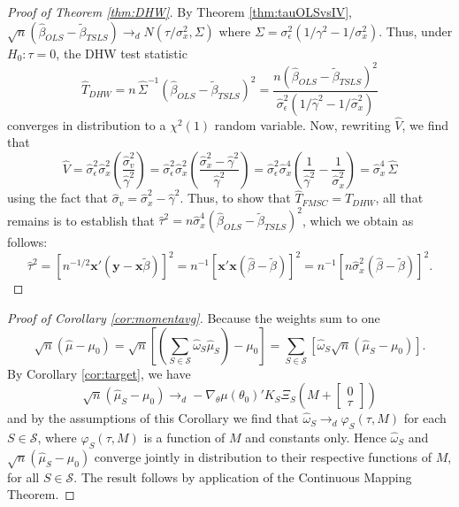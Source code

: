 \begin{proof}[Proof of Theorem \ref{thm:DHW}] 
By Theorem \ref{thm:tauOLSvsIV}, $\sqrt{n}(\widehat{\beta}_{OLS} - \widetilde{\beta}_{TSLS}) \rightarrow_d N\left(\tau/\sigma_x^2, \Sigma \right)$
where $\Sigma =  \sigma_\epsilon^2 \left(1/\gamma^2 - 1/\sigma_x^2 \right)$.
Thus, under $H_0 \colon \tau = 0$, the DHW test statistic 
$$\widehat{T}_{DHW} = n\, \widehat{\Sigma}^{-1}(\widehat{\beta}_{OLS} - \widetilde{\beta}_{TSLS})^2 = \frac{n(\widehat{\beta}_{OLS} - \widetilde{\beta}_{TSLS})^2}{ \widehat{\sigma}_\epsilon^2 \left(1/\widehat{\gamma}^2 - 1/\widehat{\sigma}_x^2 \right)}$$
converges in distribution to a $\chi^2(1)$ random variable. 
Now, rewriting $\widehat{V}$, we find that
$$\widehat{V} = \widehat{\sigma}_\epsilon^2 \widehat{\sigma}_x^2\left(\frac{\widehat{\sigma}_v^2 }{\widehat{\gamma}^2}\right) = \widehat{\sigma}_\epsilon^2 \widehat{\sigma}_x^2\left(\frac{\widehat{\sigma}_x^2 - \widehat{\gamma}^2 }{\widehat{\gamma}^2}\right) = \widehat{\sigma}_\epsilon^2 \widehat{\sigma}_x^4\left(\frac{1}{\widehat{\gamma}^2} - \frac{1}{\widehat{\sigma}_x^2}\right) = \widehat{\sigma}_x^4 \,\widehat{\Sigma}$$
using the fact that $\widehat{\sigma}_v = \widehat{\sigma}_x^2 - \widehat{\gamma}^2$. 
Thus, to show that $\widehat{T}_{FMSC} = \widehat{T}_{DHW}$, all that remains is to establish that $\widehat{\tau}^2 = n\widehat{\sigma}_x^4 (\widehat{\beta}_{OLS} - \widetilde{\beta}_{TSLS})^2$, which we obtain as follows:
    $$\widehat{\tau}^2  =  \left[n^{-1/2} \textbf{x}'(\mathbf{y} - \mathbf{x}\widetilde{\beta})\right]^2 = n^{-1}\left[\mathbf{x}'\mathbf{x} \left( \widehat{\beta} - \widetilde{\beta}\right) \right]^2 = n^{-1}\left[n \widehat{\sigma}_x^2 \left( \widehat{\beta} - \widetilde{\beta}\right) \right]^2.$$
\end{proof}

\begin{proof}[Proof of Corollary \ref{cor:momentavg}]
Because the weights sum to one
		$$\sqrt{n}\left(\widehat{\mu} - \mu_0\right) = \sqrt{n} \left[\left(\sum_{S \in \mathscr{S}} \widehat{\omega}_S \widehat{\mu}_S\right) - \mu_0\right]= \sum_{S \in \mathscr{S}}\left[ \widehat{\omega}_S \sqrt{n}\left(\widehat{\mu}_S - \mu_0\right)\right].$$
By Corollary \ref{cor:target}, we have
$$\sqrt{n}\left(\widehat{\mu}_S - \mu_0\right)\rightarrow_d-\nabla_\theta\mu(\theta_0)'K_S \Xi_S \left(M +  \left[\begin{array}
	{c} 0 \\ \tau
\end{array} \right]\right)$$
and by the assumptions of this Corollary we find that $\widehat{\omega}_S \rightarrow_d\varphi_S(\tau,M)$ for each $S\in \mathscr{S}$, where $\varphi_S(\tau,M)$ is a function of $M$ and constants only. 
Hence $\widehat{\omega}_S$ and $\sqrt{n}\left(\widehat{\mu}_S - \mu_0\right)$ converge jointly in distribution to their respective functions of $M$, for all $S \in \mathscr{S}$. 
The result follows by application of the Continuous Mapping Theorem.
\end{proof}

